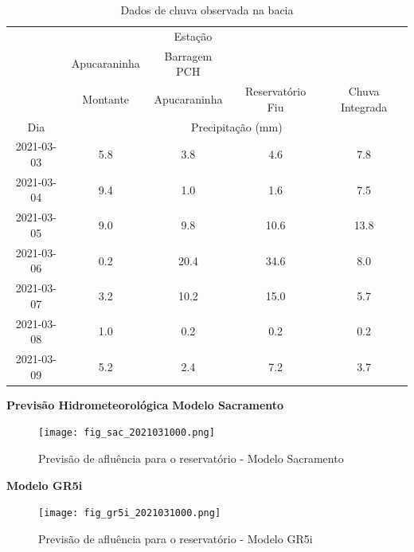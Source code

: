 \documentclass[a4paper,12pt]{article}
\begin{document}
\begin{table}[ht]
    \centering
    \caption{Dados de chuva observada na bacia}
    \vspace{6pt}
    \begin{tabular}{|c|c|c|c|c|}
        \hline
        & \multicolumn{3}{|c|}{Estação} & \\
        \hhline{~---~}
        & Apucaraninha & Barragem PCH & & \\
        & Montante & Apucaraninha & Reservatório Fiu & Chuva Integrada \\
        \hhline{~----}
        Dia & \multicolumn{4}{|c|}{Precipitação (mm)} \\
        \hline
        2021-03-03 & 5.8 & 3.8 & 4.6 & 7.8 \\
        \hline
        2021-03-04 & 9.4 & 1.0 & 1.6 & 7.5 \\
        \hline
        2021-03-05 & 9.0 & 9.8 & 10.6 & 13.8 \\
        \hline
        2021-03-06 & 0.2 & 20.4 & 34.6 & 8.0 \\
        \hline
        2021-03-07 & 3.2 & 10.2 & 15.0 & 5.7 \\
        \hline
        2021-03-08 & 1.0 & 0.2 & 0.2 & 0.2 \\
        \hline
        2021-03-09 & 5.2 & 2.4 & 7.2 & 3.7 \\
        \hline
    \end{tabular}
\end{table}

\newpage
\textbf{\large{Previsão Hidrometeorológica}}
\smallbreak
\textbf{\small{Modelo Sacramento}}\\
\begin{figure}[ht]
    \centering
    \vspace{-24pt}
    \texttt{[image: fig\_sac\_2021031000.png]}
    \caption{Previsão de afluência para o reservatório - Modelo Sacramento}
\end{figure}

\textbf{\small{Modelo GR5i}}\\
\begin{figure}[ht]
    \centering
    \vspace{-24pt}
    \texttt{[image: fig\_gr5i\_2021031000.png]}
    \caption{Previsão de afluência para o reservatório - Modelo GR5i}
\end{figure}
\end{document}
